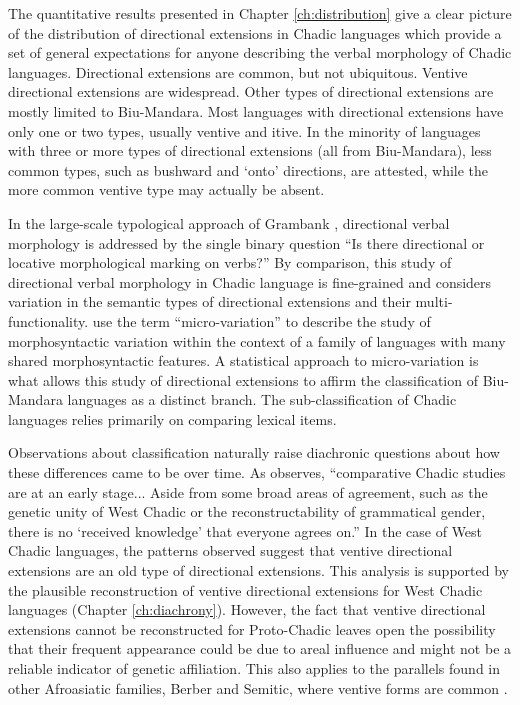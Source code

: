 The quantitative results presented in Chapter \ref{ch:distribution} give a clear picture of the distribution of directional extensions in Chadic languages which provide a set of general expectations for anyone describing the verbal morphology of Chadic languages. Directional extensions are common, but not ubiquitous. Ventive directional extensions are widespread. Other types of directional extensions are mostly limited to Biu-Mandara. Most languages with directional extensions have only one or two types, usually ventive and itive. In the minority of languages with three or more types of directional extensions (all from Biu-Mandara), less common types, such as bushward and `onto' directions, are attested, while the more common ventive type may actually be absent. 

In the large-scale typological approach of Grambank \citep{thegrambankconsortiumGrambankV12023}, directional verbal morphology is addressed by the single binary question ``Is there directional or locative morphological marking on verbs?'' By comparison, this study of directional verbal morphology in Chadic language is fine-grained and considers variation in the semantic types of directional extensions and their multi-functionality. \citet{martenParametersMorphosyntacticVariation2007} use the term ``micro-variation'' to describe the study of morphosyntactic variation within the context of a family of languages with many shared morphosyntactic features. A statistical approach to micro-variation is what allows this study of directional extensions to affirm the classification of Biu-Mandara languages as a distinct branch. The sub-classification of Chadic languages relies primarily on comparing lexical items. 

Observations about classification naturally raise diachronic questions about how these differences came to be over time. As \citet[5]{schuhChadicCornucopia2017} observes, ``comparative Chadic studies are at an early stage... Aside from some broad areas of agreement, such as the genetic unity of West Chadic or the reconstructability of grammatical gender, there is no `received knowledge' that everyone agrees on.'' In the case of West Chadic languages, the patterns observed suggest that ventive directional extensions are an old type of directional extensions. This analysis is supported by the plausible reconstruction of ventive directional extensions for West Chadic languages (Chapter \ref{ch:diachrony}). However, the fact that ventive directional extensions cannot be reconstructed for Proto-Chadic leaves open the possibility that their frequent appearance could be due to areal influence and might not be a reliable indicator of genetic affiliation. This also applies to the parallels found in other Afroasiatic families, Berber and Semitic, where ventive forms are common \citep{belkadiAssociatedMotionDeictic2015,belkadiAssociatedMotionConstructions2016,fixSemanticsSemiticVentive2020}.

